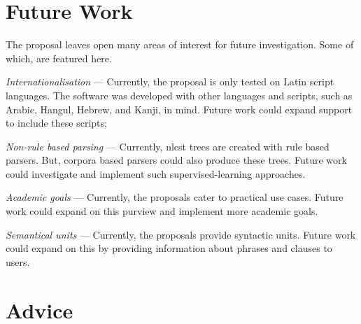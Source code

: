 \section{Future Work}\label{future-work}

The proposal leaves open many areas of interest for future investigation.
Some of which, are featured here.

\begin{aenumerate}
\item\emph{Internationalisation} --- Currently, the proposal is only
    tested on Latin script languages.
  The software was developed with other languages and scripts, such as
    Arabic, Hangul, Hebrew, and Kanji, in mind.
  Future work could expand support to include these scripts;
\item\emph{Non-rule based parsing} --- Currently, \gls{nlcst} trees are
    created with rule based parsers.
  But, corpora based parsers could also produce these trees.
  Future work could investigate and implement such supervised-learning
    approaches.
\item\emph{Academic goals} --- Currently, the proposals cater to practical use
    cases.
  Future work could expand on this purview and implement more academic
    goals.
\item\emph{Semantical units} --- Currently, the proposals provide syntactic
    units.
  Future work could expand on this by providing information about phrases
    and clauses to users.
\end{aenumerate}


\section{Advice}\label{advice}
